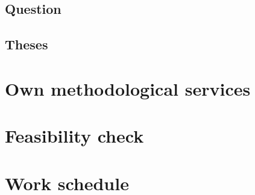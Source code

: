 \subsection{Question} %

\subsection{Theses}

\section{Own methodological services}

\section{Feasibility check}

\section{Work schedule}



